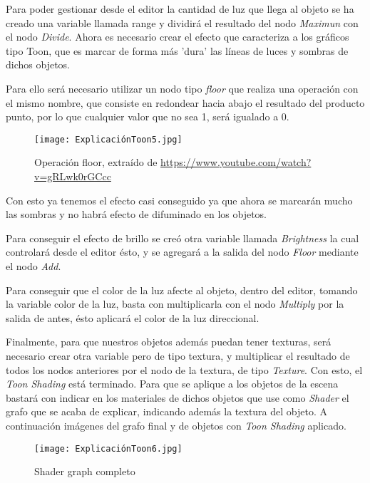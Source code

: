 Para poder gestionar desde el editor la cantidad de luz que llega al objeto se ha creado una variable llamada range y dividirá el resultado del nodo \textit{Maximun} con el nodo \textit{Divide}. Ahora es necesario crear el efecto que caracteriza a los gráficos tipo Toon, que es marcar de forma más 'dura' las líneas de luces y sombras de dichos objetos.

Para ello será necesario utilizar un nodo tipo \textit{floor} que realiza una operación con el mismo nombre, que consiste en redondear hacia abajo el resultado del producto punto, por lo que cualquier valor que no sea 1, será igualado a 0. 

\begin{figure}[H]
    \centering
    \texttt{[image: ExplicaciónToon5.jpg]}
    \caption{Operación floor, extraído de \url{https://www.youtube.com/watch?v=gRLwk0rGCcc}}
\end{figure}

Con esto ya tenemos el efecto casi conseguido ya que ahora se marcarán mucho las sombras y no habrá efecto de difuminado en los objetos.

Para conseguir el efecto de brillo se creó otra variable llamada \textit{Brightness} la cual controlará desde el editor ésto, y se agregará a la salida del nodo \textit{Floor} mediante el nodo \textit{Add}. 

Para conseguir que el color de la luz afecte al objeto, dentro del editor, tomando la variable color de la luz, basta con multiplicarla con el nodo \textit{Multiply} por la salida de antes, ésto aplicará el color de la luz direccional.

Finalmente, para que nuestros objetos además puedan tener texturas, será necesario crear otra variable pero de tipo textura, y multiplicar el resultado de todos los nodos anteriores por el nodo de la textura, de tipo \textit{Texture}. Con esto, el \textit{Toon Shading} está terminado. Para que se aplique a los objetos de la escena bastará con indicar en los materiales de dichos objetos que use como \textit{Shader} el grafo que se acaba de explicar, indicando además la textura del objeto. A continuación imágenes del grafo final y de objetos con \textit{Toon Shading} aplicado.


\begin{figure}[H]
    \centering
    \texttt{[image: ExplicaciónToon6.jpg]}
    \caption{Shader graph completo}
\end{figure}

